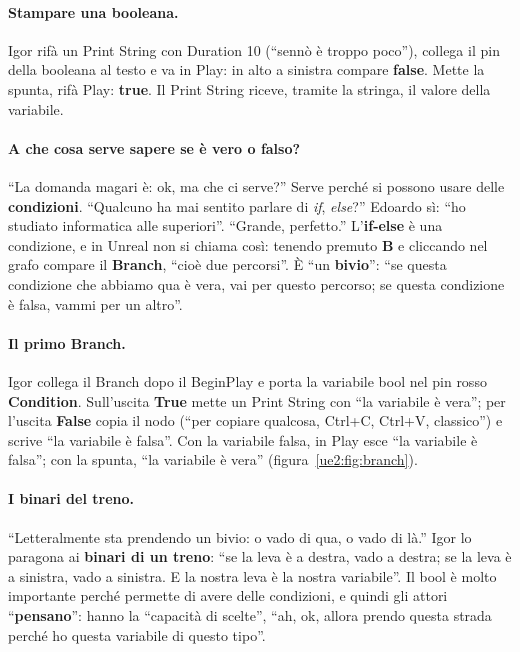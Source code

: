 \paragraph{Stampare una booleana.} Igor rifà un Print String con Duration 10 (``sennò è
troppo poco''), collega il pin della booleana al testo e va in Play: in alto a sinistra
compare \textbf{false}. Mette la spunta, rifà Play: \textbf{true}. Il Print String
riceve, tramite la stringa, il valore della variabile.

\paragraph{A che cosa serve sapere se è vero o falso?} ``La domanda magari è: ok, ma che ci
serve?'' Serve perché si possono usare delle \textbf{condizioni}. ``Qualcuno ha mai
sentito parlare di \emph{if}, \emph{else}?'' Edoardo sì: ``ho studiato informatica alle
superiori''. ``Grande, perfetto.'' L'\textbf{if-else} è una condizione, e in Unreal non si
chiama così: tenendo premuto \textbf{B} e cliccando nel grafo compare il
\textbf{Branch}, ``cioè due percorsi''. È ``un \textbf{bivio}'': ``se questa condizione
che abbiamo qua è vera, vai per questo percorso; se questa condizione è falsa, vammi per
un altro''.

\paragraph{Il primo Branch.} Igor collega il Branch dopo il BeginPlay e porta la
variabile bool nel pin rosso \textbf{Condition}. Sull'uscita \textbf{True} mette un Print
String con ``la variabile è vera''; per l'uscita \textbf{False} copia il nodo (``per
copiare qualcosa, Ctrl+C, Ctrl+V, classico'') e scrive ``la variabile è falsa''. Con la
variabile falsa, in Play esce ``la variabile è falsa''; con la spunta, ``la variabile è
vera'' (figura~\ref{ue2:fig:branch}).

\paragraph{I binari del treno.} ``Letteralmente sta prendendo un bivio: o vado di qua, o
vado di là.'' Igor lo paragona ai \textbf{binari di un treno}: ``se la leva è a destra,
vado a destra; se la leva è a sinistra, vado a sinistra. E la nostra leva è la nostra
variabile''. Il bool è molto importante perché permette di avere delle condizioni, e
quindi gli attori ``\textbf{pensano}'': hanno la ``capacità di scelte'', ``ah, ok, allora
prendo questa strada perché ho questa variabile di questo tipo''.

